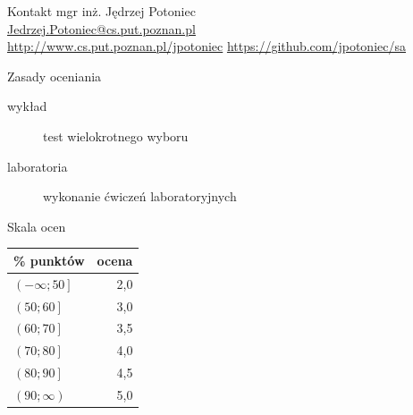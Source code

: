 \documentclass{sa}
\subtitle{Uwagi organizacyjne i wprowadzenie}
\begin{document}
\begin{frame}
\titlepage
\end{frame}
\begin{frame}{Kontakt}
mgr inż. Jędrzej Potoniec \\
\url{Jedrzej.Potoniec@cs.put.poznan.pl}\\
\url{http://www.cs.put.poznan.pl/jpotoniec}
\url{https://github.com/jpotoniec/sa}
\end{frame}
\begin{frame}{Zasady oceniania}
\begin{description}
\item[wykład] test wielokrotnego wyboru
\item[laboratoria] wykonanie ćwiczeń laboratoryjnych
\end{description}
\end{frame}
\begin{frame}{Skala ocen}
\begin{center}
\begin{tabular}{l|r}
\% punktów & ocena \\
\hline
$\left(-\infty; 50\right]$ & 2,0 \\
$\left(50; 60\right]$ & 3,0 \\
$\left(60; 70\right]$ & 3,5 \\
$\left(70; 80\right]$ & 4,0 \\
$\left(80; 90\right]$ & 4,5 \\
$\left(90; \infty\right)$ & 5,0 \\
\end{tabular}
\end{center}
\end{frame}
\end{document}
